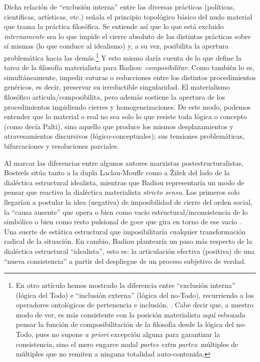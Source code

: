 Dicha relación de \enquote{exclusión interna} entre las diversas prácticas (políticas, científicas, artísticas, etc.) señala el principio topológico básico del nudo material que trama la práctica filosófica. Se entiende así que lo que está excluido \emph{internamente} sea lo que impide el cierre absoluto de las distintas prácticas sobre sí mismas (lo que conduce al idealismo) y, a su vez, posibilita la apertura problemática hacia las demás.\footnote{En otro artículo hemos mostrado la diferencia entre \enquote{exclusión interna} (lógica del Todo) e \enquote{inclusión externa} (lógica del no-Todo), recurriendo a los operadores ontológicos de pertenencia e inclusión. \cite[][]{@7145-FARRAN2007}. Cabe decir que, a nuestro modo de ver, es más consistente con la posición materialista aquí esbozada pensar la función de composibilitación de la filosofía desde la lógica del no-Todo, pues no supone \emph{a priori} excepción alguna para garantizar la consistencia, sino el mero engarce nodal \emph{partes extra partes}: múltiples de múltiples que no remiten a ninguna totalidad auto-contenida.} Y esto mismo daría cuenta de lo que define la tarea de la filosofía materialista para Badiou: \emph{composibilitar}. Como también lo es, simultáneamente, impedir suturas o reducciones entre los distintos procedimientos genéricos, es decir, preservar su irreductible singularidad. El materialismo filosófico articula/composibilita, pero además sostiene la apertura de los procedimientos impidiendo cierres y homogeneizaciones. De este modo, podemos entender que lo material o real no sea solo lo que resiste toda lógica o concepto (como decía Palti), sino aquello que produce los mismos desplazamientos y atravesamientos discursivos (lógico-conceptuales); sus tensiones problemáticas, bifurcaciones y resoluciones parciales.

Al marcar las diferencias entre algunos autores marxistas postestructuralistas, Bosteels sitúa tanto a la dupla Laclau-Mouffe como a Žižek del lado de la dialéctica estructural idealista, mientras que Badiou representaría un modo de pensar que reactiva la dialéctica materialista \emph{stricto sensu}. Los primeros solo llegarían a postular la idea (negativa) de imposibilidad de cierre del orden social, la \enquote{causa ausente} que opera o bien como vacío estructural/inconsistencia de lo simbólico  o bien como resto pulsional de goce que gira en torno de ese vacío . Una suerte de estática estructural que imposibilitaría cualquier transformación radical de la situación. En cambio, Badiou plantearía un paso más respecto de la dialéctica estructural \enquote{idealista}, esto es: la articulación efectiva (positiva) de una \enquote{nueva consistencia} a partir del despliegue de un proceso subjetivo de verdad.

